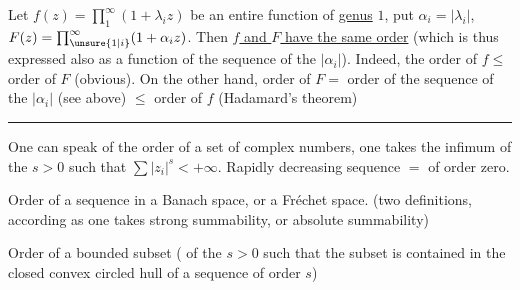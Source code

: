 Let $f(z)=\prod_1^\infty(1+\lambda_i z)$ be an entire function
of \uline{genus} $1$, put $\alpha_i=|\lambda_i|$, $F(z)=\prod_{\unsure{1|i}}^\infty(1+\alpha_i z)$.
Then \uline{$f$ and $F$ have the same order} (which is thus expressed
also as a function of the sequence of the $|\alpha_i|$). Indeed,
the order of $f\leq$ order of $F$ (obvious). On the other
hand, order of $F=$ order of the sequence of the $|\alpha_i|$
(see above) $\leq$ order of $f$ (Hadamard's theorem)
\begin{center}\rule{1.5cm}{0.4pt}\end{center}

One can speak of the order of a  set of
complex numbers,  
one takes the infimum of the $s>0$ such that
$\sum|z_i|^s<+\infty$. Rapidly decreasing sequence $=$
of order zero.

Order of a sequence in a Banach space,
or a Fréchet space. (two definitions, according as one
takes strong summability, or absolute summability)

Order of a bounded subset (  of the
$s>0$ such that the subset is contained in the\newline
closed convex circled hull of a sequence of order $s$)
